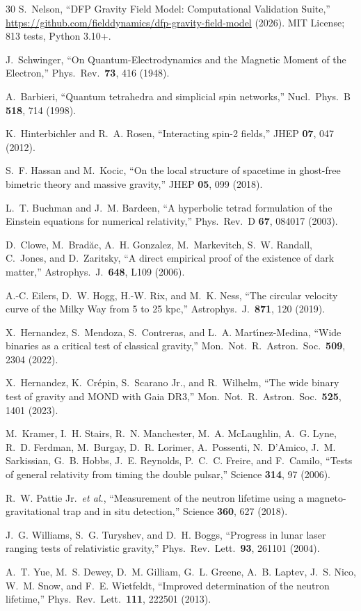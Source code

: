 \documentclass[aps,prd,preprint,superscriptaddress,showpacs,preprintnumbers,amsmath,amssymb,nofootinbib]{revtex4-2}
\begin{document}
\begin{thebibliography}{30}
S.~Nelson, ``DFP Gravity Field Model: Computational Validation Suite,'' \url{https://github.com/fielddynamics/dfp-gravity-field-model} (2026). MIT License; 813 tests, Python 3.10+.

J.~Schwinger, ``On Quantum-Electrodynamics and the Magnetic Moment of the Electron,'' Phys.\ Rev.\ \textbf{73}, 416 (1948).

A.~Barbieri, ``Quantum tetrahedra and simplicial spin networks,'' Nucl.\ Phys.\ B \textbf{518}, 714 (1998).

K.~Hinterbichler and R.~A. Rosen, ``Interacting spin-2 fields,'' JHEP \textbf{07}, 047 (2012).

S.~F. Hassan and M.~Kocic, ``On the local structure of spacetime in ghost-free bimetric theory and massive gravity,'' JHEP \textbf{05}, 099 (2018).

L.~T. Buchman and J.~M. Bardeen, ``A hyperbolic tetrad formulation of the Einstein equations for numerical relativity,'' Phys.\ Rev.\ D \textbf{67}, 084017 (2003).

D.~Clowe, M.~Brad\u{a}c, A.~H. Gonzalez, M.~Markevitch, S.~W. Randall, C.~Jones, and D.~Zaritsky, ``A direct empirical proof of the existence of dark matter,'' Astrophys.\ J.\ \textbf{648}, L109 (2006).

A.-C. Eilers, D.~W. Hogg, H.-W. Rix, and M.~K. Ness, ``The circular velocity curve of the Milky Way from 5 to 25 kpc,'' Astrophys.\ J.\ \textbf{871}, 120 (2019).

X.~Hernandez, S.~Mendoza, S.~Contreras, and L.~A. Mart\'{\i}nez-Medina, ``Wide binaries as a critical test of classical gravity,'' Mon.\ Not.\ R.\ Astron.\ Soc.\ \textbf{509}, 2304 (2022).

X.~Hernandez, K.~Cr\'epin, S.~Scarano Jr., and R.~Wilhelm, ``The wide binary test of gravity and MOND with Gaia DR3,'' Mon.\ Not.\ R.\ Astron.\ Soc.\ \textbf{525}, 1401 (2023).

M.~Kramer, I.~H. Stairs, R.~N. Manchester, M.~A. McLaughlin, A.~G. Lyne, R.~D. Ferdman, M.~Burgay, D.~R. Lorimer, A.~Possenti, N.~D'Amico, J.~M. Sarkissian, G.~B. Hobbs, J.~E. Reynolds, P.~C.~C. Freire, and F.~Camilo, ``Tests of general relativity from timing the double pulsar,'' Science \textbf{314}, 97 (2006).

R.~W. Pattie Jr.\ \textit{et al.}, ``Measurement of the neutron lifetime using a magneto-gravitational trap and in situ detection,'' Science \textbf{360}, 627 (2018).

J.~G. Williams, S.~G. Turyshev, and D.~H. Boggs, ``Progress in lunar laser ranging tests of relativistic gravity,'' Phys.\ Rev.\ Lett.\ \textbf{93}, 261101 (2004).

A.~T. Yue, M.~S. Dewey, D.~M. Gilliam, G.~L. Greene, A.~B. Laptev, J.~S. Nico, W.~M. Snow, and F.~E. Wietfeldt, ``Improved determination of the neutron lifetime,'' Phys.\ Rev.\ Lett.\ \textbf{111}, 222501 (2013).

\end{thebibliography}
\end{document}
